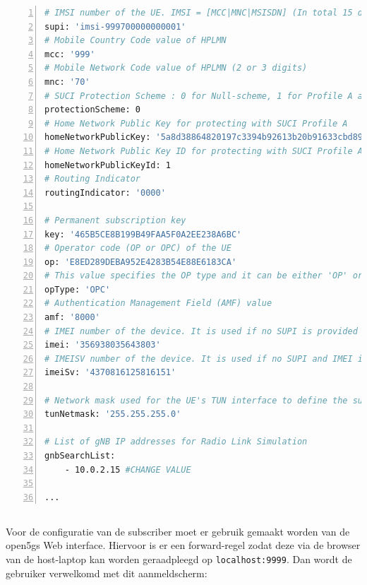 \begin{lstlisting}[basicstyle=\small, frame=single, breaklines=true, postbreak=\mbox{\textcolor{red}{$\hookrightarrow$}\space}, escapeinside ={\%,}, escapechar={!}, numbers=left, language=sh, caption=UE configuratie]
# IMSI number of the UE. IMSI = [MCC|MNC|MSISDN] (In total 15 digits)
supi: 'imsi-999700000000001'
# Mobile Country Code value of HPLMN
mcc: '999'
# Mobile Network Code value of HPLMN (2 or 3 digits)
mnc: '70'
# SUCI Protection Scheme : 0 for Null-scheme, 1 for Profile A and 2 for Profile B
protectionScheme: 0
# Home Network Public Key for protecting with SUCI Profile A
homeNetworkPublicKey: '5a8d38864820197c3394b92613b20b91633cbd897119273bf8e4a6f4eec0a650'
# Home Network Public Key ID for protecting with SUCI Profile A
homeNetworkPublicKeyId: 1
# Routing Indicator
routingIndicator: '0000'

# Permanent subscription key
key: '465B5CE8B199B49FAA5F0A2EE238A6BC'
# Operator code (OP or OPC) of the UE
op: 'E8ED289DEBA952E4283B54E88E6183CA'
# This value specifies the OP type and it can be either 'OP' or 'OPC'
opType: 'OPC'
# Authentication Management Field (AMF) value
amf: '8000'
# IMEI number of the device. It is used if no SUPI is provided
imei: '356938035643803'
# IMEISV number of the device. It is used if no SUPI and IMEI is provided
imeiSv: '4370816125816151'

# Network mask used for the UE's TUN interface to define the subnet size
tunNetmask: '255.255.255.0'

# List of gNB IP addresses for Radio Link Simulation
gnbSearchList:
    - 10.0.2.15 #CHANGE VALUE

...
\end{lstlisting}

\subsection{}%
\label{sec:subscriber_config}%

Voor de configuratie van de subscriber moet er gebruik gemaakt worden van de \gls{open5gs} Web interface. Hiervoor is er een forward-regel zodat deze via de browser van de host-laptop kan worden geraadpleegd op \lstinline!localhost:9999!. Dan wordt de gebruiker verwelkomd met dit aanmeldscherm:

